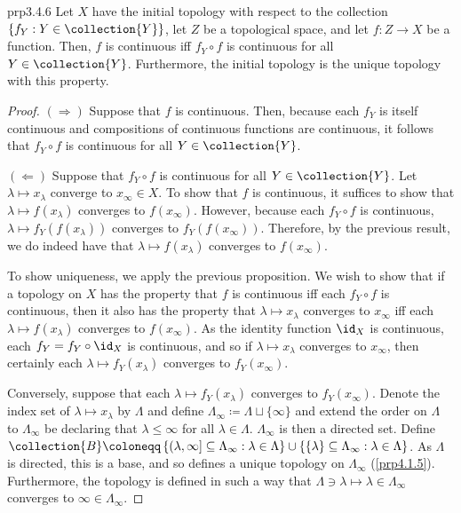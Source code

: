 \begin{prp}{}{prp3.4.6}
Let $X$ have the initial topology with respect to the collection $\{ f_Y:Y\in \collection{Y}\}$, let $Z$ be a topological space, and let $f\colon Z\rightarrow X$ be a function.  Then, $f$ is continuous iff $f_Y\circ f$ is continuous for all $Y\in \collection{Y}$.  Furthermore, the initial topology is the unique topology with this property.
\begin{proof}
$(\Rightarrow )$ Suppose that $f$ is continuous.  Then, because each $f_Y$ is itself continuous and compositions of continuous functions are continuous, it follows that $f_Y\circ f$ is continuous for all $Y\in \collection{Y}$.

\blankline
\noindent
$(\Leftarrow )$ Suppose that $f_Y\circ f$ is continuous for all $Y\in \collection{Y}$.  Let $\lambda \mapsto x_\lambda$ converge to $x_\infty \in X$.  To show that $f$ is continuous, it suffices to show that $\lambda \mapsto f(x_\lambda)$ converges to $f(x_\infty )$.  However, because each $f_Y\circ f$ is continuous, $\lambda \mapsto f_Y(f(x_\lambda ))$ converges to $f_Y(f(x_\infty ) )$.  Therefore, by the previous result, we do indeed have that $\lambda \mapsto f(x_\lambda)$ converges to $f(x_\infty )$.

\blankline
\noindent
To show uniqueness, we apply the previous proposition.  We wish to show that if a topology on $X$ has the property that $f$ is continuous iff each $f_Y\circ f$ is continuous, then it also has the property that $\lambda \mapsto x_{\lambda}$ converges to $x_{\infty}$ iff each $\lambda \mapsto f(x_{\lambda})$ converges to $f(x_{\infty})$.  As the identity function $\id _X$ is continuous, each $f_Y=f_Y\circ \id _X$ is continuous, and so if $\lambda \mapsto x_{\lambda}$ converges to $x_{\infty}$, then certainly each $\lambda \mapsto f_Y(x_{\lambda})$ converges to $f_Y(x_{\infty})$.

Conversely, suppose that each $\lambda \mapsto f_Y(x_{\lambda})$ converges to $f_Y(x_{\infty})$.  Denote the index set of $\lambda \mapsto x_{\lambda}$ by $\Lambda$ and define $\Lambda _{\infty}\coloneqq \Lambda \sqcup \{ \infty \}$ and extend the order on $\Lambda$ to $\Lambda _{\infty}$ be declaring that $\lambda \leq \infty$ for all $\lambda \in \Lambda$.  $\Lambda _{\infty}$ is then a directed set.  Define $\collection{B}\coloneqq \left\{ (\lambda ,\infty ]\subseteq \Lambda _{\infty}:\lambda \in \Lambda \right\} \cup \left\{ \{ \lambda \} \subseteq \Lambda _{\infty}:\lambda \in \Lambda \right\}$.  As $\Lambda$ is directed, this is a base, and so defines a unique topology on $\Lambda _{\infty}$ (\cref{prp4.1.5}).  Furthermore, the topology is defined in such a way that $\Lambda \ni \lambda \mapsto \lambda \in \Lambda _{\infty}$ converges to $\infty \in \Lambda _{\infty}$.


\end{proof}
\end{prp}
